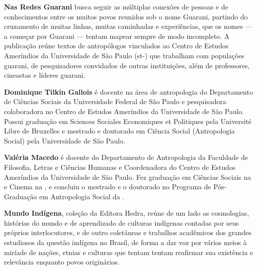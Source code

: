 \textbf{Nas Redes Guarani} busca seguir as múltiplas conexões de pessoas e de conhecimentos entre
os muitos povos reunidos sob o nome Guarani, partindo do cruzamento de muitas linhas, muitas
caminhadas e experiências, que os nomes — a começar por Guarani — tentam mapear sempre de modo
incompleto. A publicação reúne textos de antropólogos vinculados ao Centro de Estudos Ameríndios
da Universidade de São Paulo (st-) que trabalham com populações
guarani, de pesquisadores convidados de outras instituições, além de professores, cineastas e
líderes guarani.

\textbf{Dominique Tilkin Gallois} é docente na área de antropologia do Departamento de Ciências
Sociais da Universidade Federal de São Paulo e pesquisadora colaboradora no Centro de Estudos
Ameríndios da Universidade de São Paulo. Possui graduação em Sciences Sociales Economiques et
Politiques pela Université Libre de Bruxelles e mestrado e doutorado em Ciência Social
(Antropologia Social) pela Universidade de São Paulo.

\textbf{Valéria Macedo} é docente do Departamento de Antropologia da Faculdade de Filosofia,
Letras e Ciências Humanas e Coordenadora do Centro de Estudos Ameríndios da Universidade de São
Paulo. Fez graduação em Ciências Sociais na  e Cinema na , e concluiu o
mestrado e o doutorado no Programa de Pós-Graduação em Antropologia Social da .

\textbf{Mundo Indígena}, coleção da Editora Hedra, reúne de um lado as cosmologias, histórias do
mundo e de aprendizado de culturas indígenas contadas por seus próprios interlocutores, e de outro
coletâneas e trabalhos acadêmicos dos grandes estudiosos da questão indígena no Brasil, de forma a
dar voz por vários meios à miríade de nações, etnias e culturas que tentam tentam reafirmar sua
existência e relevância enquanto povos originários.